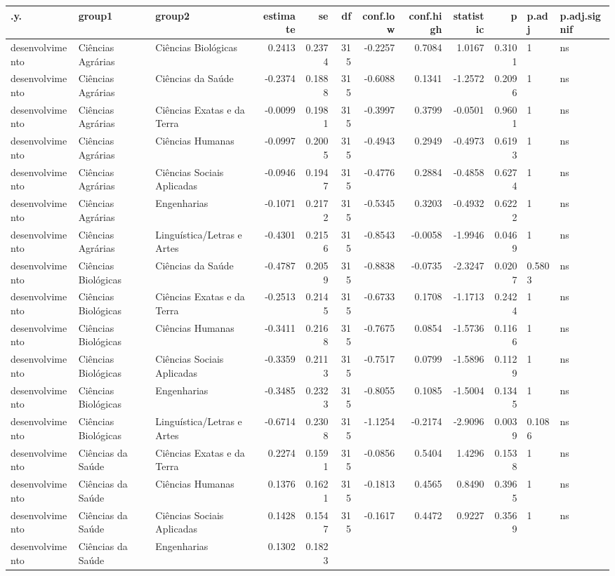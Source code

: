 \documentclass[]{article}
\begin{document}
\begin{longtable}[]{@{}lllrrrrrrrll@{}}
\toprule
.y. & group1 & group2 & estimate & se & df & conf.low & conf.high &
statistic & p & p.adj & p.adj.signif\tabularnewline
\midrule
\endhead
desenvolvimento & Ciências Agrárias & Ciências Biológicas & 0.2413 &
0.2374 & 315 & -0.2257 & 0.7084 & 1.0167 & 0.3101 & 1 &
ns\tabularnewline
desenvolvimento & Ciências Agrárias & Ciências da Saúde & -0.2374 &
0.1888 & 315 & -0.6088 & 0.1341 & -1.2572 & 0.2096 & 1 &
ns\tabularnewline
desenvolvimento & Ciências Agrárias & Ciências Exatas e da Terra &
-0.0099 & 0.1981 & 315 & -0.3997 & 0.3799 & -0.0501 & 0.9601 & 1 &
ns\tabularnewline
desenvolvimento & Ciências Agrárias & Ciências Humanas & -0.0997 &
0.2005 & 315 & -0.4943 & 0.2949 & -0.4973 & 0.6193 & 1 &
ns\tabularnewline
desenvolvimento & Ciências Agrárias & Ciências Sociais Aplicadas &
-0.0946 & 0.1947 & 315 & -0.4776 & 0.2884 & -0.4858 & 0.6274 & 1 &
ns\tabularnewline
desenvolvimento & Ciências Agrárias & Engenharias & -0.1071 & 0.2172 &
315 & -0.5345 & 0.3203 & -0.4932 & 0.6222 & 1 & ns\tabularnewline
desenvolvimento & Ciências Agrárias & Linguística/Letras e Artes &
-0.4301 & 0.2156 & 315 & -0.8543 & -0.0058 & -1.9946 & 0.0469 & 1 &
ns\tabularnewline
desenvolvimento & Ciências Biológicas & Ciências da Saúde & -0.4787 &
0.2059 & 315 & -0.8838 & -0.0735 & -2.3247 & 0.0207 & 0.5803 &
ns\tabularnewline
desenvolvimento & Ciências Biológicas & Ciências Exatas e da Terra &
-0.2513 & 0.2145 & 315 & -0.6733 & 0.1708 & -1.1713 & 0.2424 & 1 &
ns\tabularnewline
desenvolvimento & Ciências Biológicas & Ciências Humanas & -0.3411 &
0.2168 & 315 & -0.7675 & 0.0854 & -1.5736 & 0.1166 & 1 &
ns\tabularnewline
desenvolvimento & Ciências Biológicas & Ciências Sociais Aplicadas &
-0.3359 & 0.2113 & 315 & -0.7517 & 0.0799 & -1.5896 & 0.1129 & 1 &
ns\tabularnewline
desenvolvimento & Ciências Biológicas & Engenharias & -0.3485 & 0.2323 &
315 & -0.8055 & 0.1085 & -1.5004 & 0.1345 & 1 & ns\tabularnewline
desenvolvimento & Ciências Biológicas & Linguística/Letras e Artes &
-0.6714 & 0.2308 & 315 & -1.1254 & -0.2174 & -2.9096 & 0.0039 & 0.1086 &
ns\tabularnewline
desenvolvimento & Ciências da Saúde & Ciências Exatas e da Terra &
0.2274 & 0.1591 & 315 & -0.0856 & 0.5404 & 1.4296 & 0.1538 & 1 &
ns\tabularnewline
desenvolvimento & Ciências da Saúde & Ciências Humanas & 0.1376 & 0.1621
& 315 & -0.1813 & 0.4565 & 0.8490 & 0.3965 & 1 & ns\tabularnewline
desenvolvimento & Ciências da Saúde & Ciências Sociais Aplicadas &
0.1428 & 0.1547 & 315 & -0.1617 & 0.4472 & 0.9227 & 0.3569 & 1 &
ns\tabularnewline
desenvolvimento & Ciências da Saúde & Engenharias & 0.1302 & 0.1823 &

\end{longtable}
\end{document}
